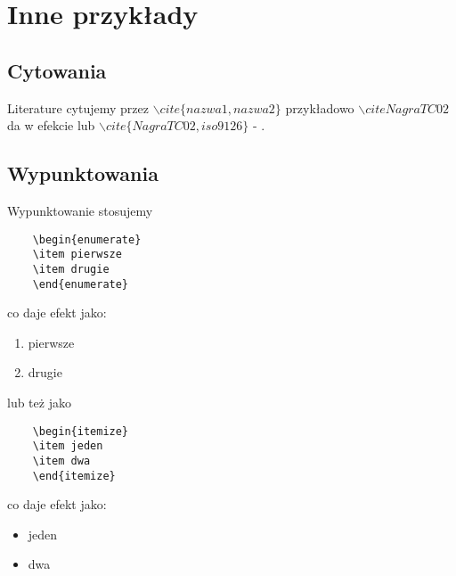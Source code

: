 \chapter[Inny tytuł do spisu treści]{Inne przykłady}
\section{Cytowania}
Literature cytujemy przez $\backslash cite\{nazwa1,nazwa2\}$ przykładowo $\backslash cite{NagraTC02}$ da w efekcie \cite{NagraTC02} lub $\backslash cite\{NagraTC02,iso9126\}$ - \cite{NagraTC02,iso9126}.
\section{Wypunktowania}
Wypunktowanie stosujemy 
\begin{verbatim}
    \begin{enumerate}
    \item pierwsze
    \item drugie
    \end{enumerate}
\end{verbatim}
co daje efekt jako:
    \begin{enumerate}
    \item pierwsze
    \item drugie
    \end{enumerate}
lub też jako
\begin{verbatim}
    \begin{itemize}
    \item jeden
    \item dwa
    \end{itemize}
\end{verbatim}
co daje efekt jako:
    \begin{itemize}
    \item jeden
    \item dwa
    \end{itemize}
